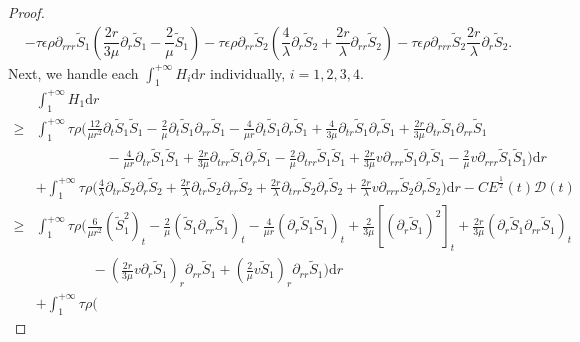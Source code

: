\documentclass[10pt,reqno]{amsart}
\numberwithin{equation}{section}
\begin{document}
\begin{proof}
\begin{equation}
\begin{aligned}
				&-{\tau\epsilon\rho\partial_{rrr}\tilde{S}_1}(\dfrac{2r}{3\mu}\partial_{r}\tilde{S}_1 -\dfrac{2}{\mu}\tilde{S}_1)
				-\tau\epsilon\rho\partial_{rr}\tilde{S}_2
				(\dfrac{4}{\lambda}\partial_{r}\tilde{S}_2+\dfrac{2r}{\lambda}\partial_{rr}\tilde{S}_2)
				-\tau\epsilon\rho\partial_{rrr}\tilde{S}_2
				\dfrac{2r}{\lambda}\partial_{r}\tilde{S}_2.
			\end{aligned}
		\end{equation}
		Next, we handle each \(\int_{1}^{+\infty}H_i\mathrm{d}r\) individually, \(i=1,2,3,4\).
		\begin{equation}\nonumber
			\begin{aligned}
				&\int_{1}^{+\infty}H_1\mathrm{d}r\\
				\geq&
				\int_{1}^{+\infty}\tau\rho\bigg(
				\frac{12}{\mu r^2}\partial_{t}\tilde{S}_1\tilde{S}_1
				-\frac{2}{\mu}\partial_{t}\tilde{S}_1\partial_{rr}\tilde{S}_1
				-\frac{4}{\mu r} \partial_{t}\tilde{S}_1\partial_{r}\tilde{S}_1
				+\frac{4}{3\mu} \partial_{tr}\tilde{S}_1\partial_{r}\tilde{S}_1
				+\frac{2r}{3\mu} \partial_{tr}\tilde{S}_1\partial_{rr}\tilde{S}_1
				\\
				&\qquad\qquad\quad-\frac{4}{\mu r} \partial_{tr}\tilde{S}_1\tilde{S}_1
				+\frac{2r}{3\mu} \partial_{trr}\tilde{S}_1\partial_{r}\tilde{S}_1
				-\frac{2}{\mu} \partial_{trr}\tilde{S}_1\tilde{S}_1
				+\frac{2r}{3\mu} v\partial_{rrr}\tilde{S}_1\partial_{r}\tilde{S}_1
				-\frac{2}{\mu} v\partial_{rrr}\tilde{S}_1\tilde{S}_1
				\bigg)\mathrm{d}r\\
				&+\int_{1}^{+\infty}\tau\rho\bigg(
				\frac{4}{\lambda}\partial_{tr}\tilde{S}_2\partial_{r}\tilde{S}_2
				+\frac{2r}{\lambda}\partial_{tr}\tilde{S}_2\partial_{rr}\tilde{S}_2
				+\frac{2r}{\lambda}\partial_{trr}\tilde{S}_2\partial_{r}\tilde{S}_2
				+\frac{2r}{\lambda}v\partial_{rrr}\tilde{S}_2\partial_{r}\tilde{S}_2
				\bigg)\mathrm{d}r
				-C E^{\frac{1}{2}}(t) \mathcal{D}(t)\\
				\geq&
				\int_{1}^{+\infty}\tau\rho\bigg(
				\frac{6}{\mu r^2}(\tilde{S}_1^2)_t
				-\frac{2}{\mu}(\tilde{S}_1\partial_{rr}\tilde{S}_1)_t
				-\frac{4}{\mu r}(\partial_{r}\tilde{S}_1\tilde{S}_1)_t
				+\frac{2}{3\mu} [(\partial_{r}\tilde{S}_1)^2]_t
				+\frac{2r}{3\mu} (\partial_{r}\tilde{S}_1\partial_{rr}\tilde{S}_1)_t
				\\
				&\qquad\qquad-(\frac{2r}{3\mu} v\partial_{r}\tilde{S}_1)_r\partial_{rr}\tilde{S}_1+(\frac{2}{\mu} v\tilde{S}_1)_r\partial_{rr}\tilde{S}_1
				\bigg)\mathrm{d}r\\
				&+\int_{1}^{+\infty}\tau\rho\bigg(

\end{aligned}
\end{equation}
\end{proof}
\end{document}
